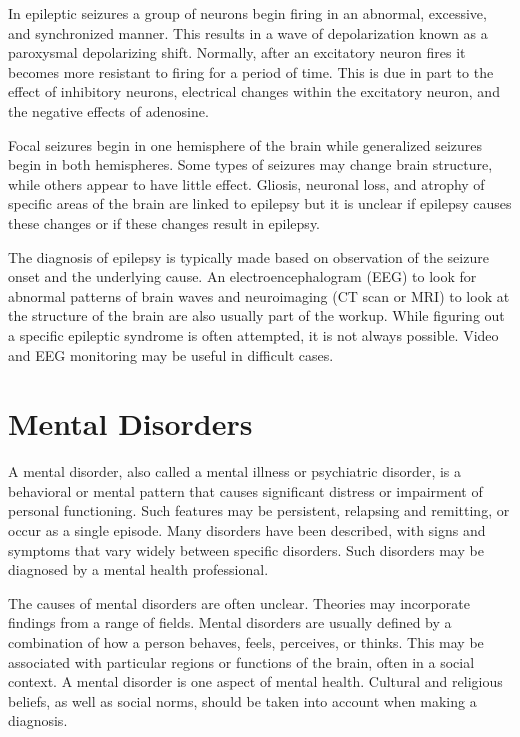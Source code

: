 In epileptic seizures a group of neurons begin firing in an abnormal,
excessive, and synchronized manner. This results in a wave of
depolarization known as a paroxysmal depolarizing shift. Normally, after
an excitatory neuron fires it becomes more resistant to firing for a
period of time. This is due in part to the effect of inhibitory neurons,
electrical changes within the excitatory neuron, and the negative
effects of adenosine.

Focal seizures begin in one hemisphere of the brain while generalized
seizures begin in both hemispheres. Some types of seizures may change
brain structure, while others appear to have little effect. Gliosis,
neuronal loss, and atrophy of specific areas of the brain are linked to
epilepsy but it is unclear if epilepsy causes these changes or if these
changes result in epilepsy.

The diagnosis of epilepsy is typically made based on observation of the
seizure onset and the underlying cause. An electroencephalogram (EEG) to
look for abnormal patterns of brain waves and neuroimaging (CT scan or
MRI) to look at the structure of the brain are also usually part of the
workup. While figuring out a specific epileptic syndrome is often
attempted, it is not always possible. Video and EEG monitoring may be
useful in difficult cases.

\hypertarget{mental-disorders}{%
\section{Mental Disorders}\label{mental-disorders}}

A mental disorder, also called a mental illness or psychiatric disorder,
is a behavioral or mental pattern that causes significant distress or
impairment of personal functioning. Such features may be persistent,
relapsing and remitting, or occur as a single episode. Many disorders
have been described, with signs and symptoms that vary widely between
specific disorders. Such disorders may be diagnosed by a mental health
professional.

The causes of mental disorders are often unclear. Theories may
incorporate findings from a range of fields. Mental disorders are
usually defined by a combination of how a person behaves, feels,
perceives, or thinks. This may be associated with particular regions or
functions of the brain, often in a social context. A mental disorder is
one aspect of mental health. Cultural and religious beliefs, as well as
social norms, should be taken into account when making a diagnosis.

